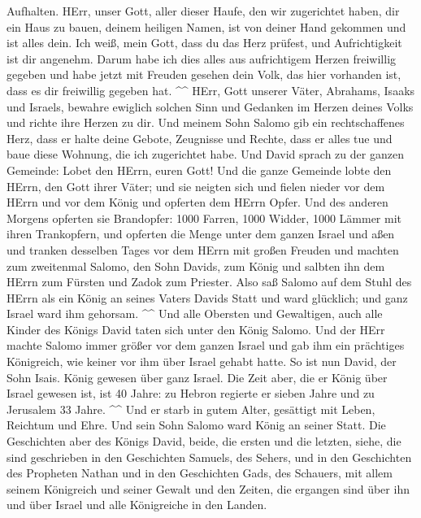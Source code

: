 Aufhalten.  HErr, unser Gott, aller dieser Haufe, den wir
zugerichtet haben, dir ein Haus zu bauen, deinem heiligen Namen, ist von
deiner Hand gekommen und ist alles dein.  Ich weiß, mein
Gott, dass du das Herz prüfest, und Aufrichtigkeit ist dir angenehm.
Darum habe ich dies alles aus aufrichtigem Herzen freiwillig gegeben und
habe jetzt mit Freuden gesehen dein Volk, das hier vorhanden ist, dass
es dir freiwillig gegeben hat. \^{}\^{}  HErr, Gott
unserer Väter, Abrahams, Isaaks und Israels, bewahre ewiglich solchen
Sinn und Gedanken im Herzen deines Volks und richte ihre Herzen zu dir.
 Und meinem Sohn Salomo gib ein rechtschaffenes Herz,
dass er halte deine Gebote, Zeugnisse und Rechte, dass er alles tue und
baue diese Wohnung, die ich zugerichtet habe.  Und David
sprach zu der ganzen Gemeinde: Lobet den HErrn, euren Gott! Und die
ganze Gemeinde lobte den HErrn, den Gott ihrer Väter; und sie neigten
sich und fielen nieder vor dem HErrn und vor dem König 
und opferten dem HErrn Opfer. Und des anderen Morgens opferten sie
Brandopfer: 1000 Farren, 1000 Widder, 1000 Lämmer mit ihren Trankopfern,
und opferten die Menge unter dem ganzen Israel  und aßen
und tranken desselben Tages vor dem HErrn mit großen Freuden und machten
zum zweitenmal Salomo, den Sohn Davids, zum König und salbten ihn dem
HErrn zum Fürsten und Zadok zum Priester.  Also saß
Salomo auf dem Stuhl des HErrn als ein König an seines Vaters Davids
Statt und ward glücklich; und ganz Israel ward ihm gehorsam. \^{}\^{}
 Und alle Obersten und Gewaltigen, auch alle Kinder des
Königs David taten sich unter den König Salomo.  Und der
HErr machte Salomo immer größer vor dem ganzen Israel und gab ihm ein
prächtiges Königreich, wie keiner vor ihm über Israel gehabt hatte.
 So ist nun David, der Sohn Isais. König gewesen über
ganz Israel.  Die Zeit aber, die er König über Israel
gewesen ist, ist 40 Jahre: zu Hebron regierte er sieben Jahre und zu
Jerusalem 33 Jahre. \^{}\^{}  Und er starb in gutem
Alter, gesättigt mit Leben, Reichtum und Ehre. Und sein Sohn Salomo ward
König an seiner Statt.  Die Geschichten aber des Königs
David, beide, die ersten und die letzten, siehe, die sind geschrieben in
den Geschichten Samuels, des Sehers, und in den Geschichten des
Propheten Nathan und in den Geschichten Gads, des Schauers,
 mit allem seinem Königreich und seiner Gewalt und den
Zeiten, die ergangen sind über ihn und über Israel und alle Königreiche
in den Landen.
